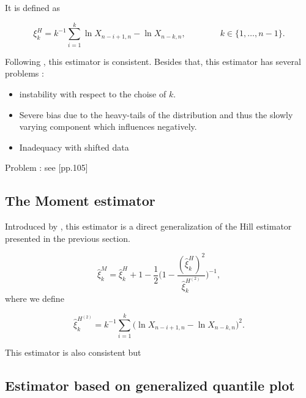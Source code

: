 

It is defined as 

\begin{equation}
\xi^H_{k}=k^{-1}\sum_{i=1}^k\ln X_{n-i+1,n}-\ln X_{n-k,n}, \qquad\qquad k\in\{1,\dots,n-1\}.
\end{equation}



Following \cite{mason_}, this estimator is consistent. Besides that, this estimator has several problems : 

\begin{itemize}
	\item instability with respect to the choise of $k$.
	\item Severe bias due to the heavy-tails of the distribution and thus the slowly varying component which influences negatively.
	\item Inadequacy with shifted data
\end{itemize}


Problem : see [pp.105]


\subsection*{The Moment estimator}

Introduced by \cite{dekkers_moment_1989}, this estimator is a direct generalization of the Hill estimator presented in the previous section. 

\begin{equation}
\hat{\xi}^M_k=\hat{\xi}_k^H+1-\frac{1}{2}\Bigg(1-\frac{(\hat{\xi}_k^H)^2}{\hat{\xi}^{H^{(2)}}_k }\Bigg)^{-1},
\end{equation}
where we define 

\begin{equation*}
\hat{\xi}^{H^{(2)}}_k=k^{-1}\sum_{i=1}^k\big(\ln X_{n-i+1,n}-\ln X_{n-k,n}\big)^2.
\end{equation*}


This estimator is also consistent but  


\subsection*{Estimator based on generalized quantile plot}

